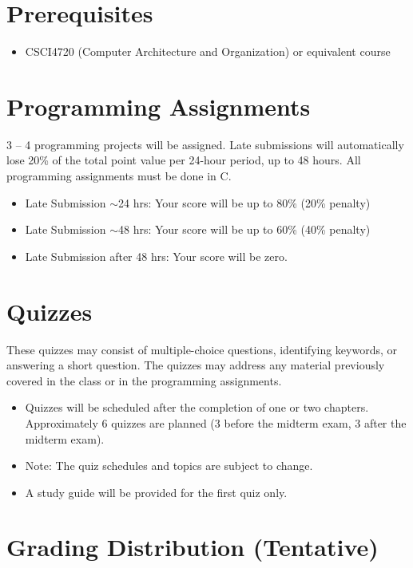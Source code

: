 \documentclass[11pt,letterpaper]{article}
\begin{document}
\section*{Prerequisites}

\begin{itemize}[leftmargin=1cm]
    \item CSCI4720 (Computer Architecture and Organization) or equivalent course
\end{itemize}

\section*{Programming Assignments}

3 -- 4 programming projects will be assigned. Late submissions will automatically lose 20\% of the total point value per 24-hour period, up to 48 hours. All programming assignments must be done in C.

\begin{itemize}[leftmargin=1cm]
    \item Late Submission $\sim$24 hrs: Your score will be up to 80\% (20\% penalty)
    \item Late Submission $\sim$48 hrs: Your score will be up to 60\% (40\% penalty)
    \item Late Submission after 48 hrs: Your score will be zero.
\end{itemize}

\section*{Quizzes}

These quizzes may consist of multiple-choice questions, identifying keywords, or answering a short question. The quizzes may address any material previously covered in the class or in the programming assignments.

\begin{itemize}[leftmargin=1cm]
    \item Quizzes will be scheduled after the completion of one or two chapters. Approximately 6 quizzes are planned (3 before the midterm exam, 3 after the midterm exam).
    \item Note: The quiz schedules and topics are subject to change.
    \item A study guide will be provided for the first quiz only.
\end{itemize}

\section*{Grading Distribution (Tentative)}
\end{document}
